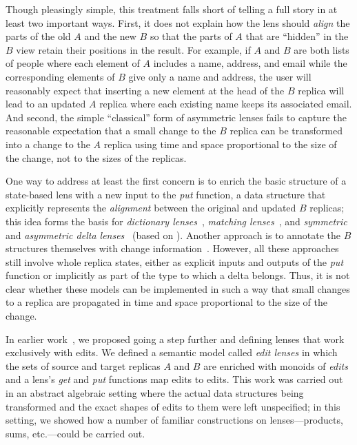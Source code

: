 \documentclass{eceasst}
\begin{document}
Though pleasingly simple, this treatment falls short of telling a full story
in at least two important ways.
First, it does not explain how the lens should {\em align} the parts of the
old $A$ and the new $B$ so that the parts of $A$ that are ``hidden'' in the
$B$ view retain their positions in the result.  For example, if $A$ and $B$
are both lists of people where each element of $A$ includes a name, address,
and email while the corresponding elements of $B$ give only a name and
address, the user will reasonably expect that inserting a new element at the
head of the $B$ replica will lead to an updated $A$ replica where each
existing name keeps its associated email.  And second, the simple
``classical'' form of asymmetric lenses fails to capture the reasonable
expectation that a small change to the $B$ replica can be transformed into a
change to the $A$ replica using time and space proportional to the size of
the change, not to the sizes of the replicas.  

One way to address at least the first concern is to enrich the basic
structure of a state-based lens with a new input to the {\em put} function,
a data structure that explicitly represents the {\em alignment} between the
original and updated $B$ replicas; this idea forms the basis for {\em
  dictionary lenses}~\cite{Boomerang07}, {\em matching
  lenses}~\cite{Matching10}, and {\em symmetric}~\cite{Diskin-Delta11} and
{\em asymmetric delta lenses}~\cite{diskin2011asymmetric} (based on
\cite{Stevens07}).  Another approach is to annotate the $B$ structures themselves with
change information~\cite{HuModels07, Hidaka10}.  However, all these
approaches still involve whole replica states, either as explicit inputs and
outputs of the {\em put} function or implicitly as part of the type to which
a delta belongs.  Thus, it is not clear whether these models can be
implemented in such a way that small changes to a replica are propagated in
time and space proportional to the size of the change.


In earlier work~\cite{HofmannPierceWagner12}, we proposed going a step further and defining
lenses that work exclusively with edits.  We defined a semantic model called
{\em edit lenses} in which the sets of source and target replicas $A$ and
$B$ are enriched with monoids of {\em edits} and a lens's {\em get} and {\em
  put} functions map edits to edits.  This work was carried out in an
abstract algebraic setting where the actual data structures being
transformed and the exact shapes of edits to them were left unspecified; in
this setting, we showed how a number of familiar constructions on
lenses---products, sums, etc.---could be carried out.
\end{document}
